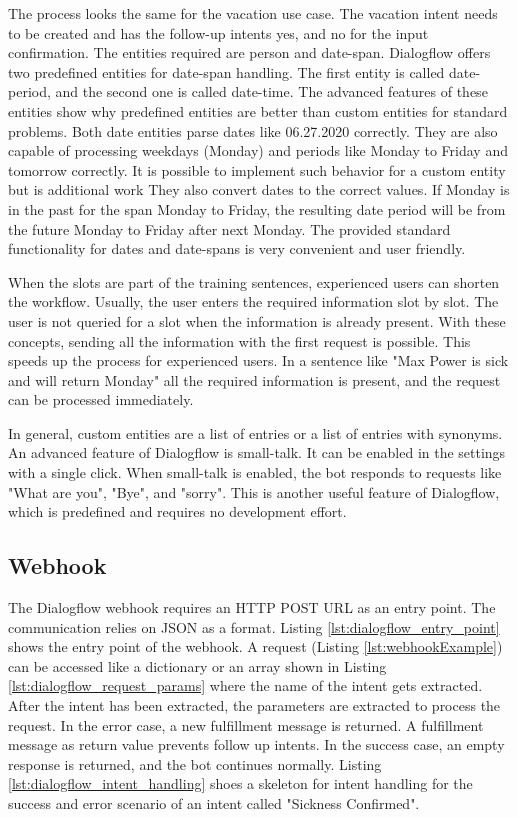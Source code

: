 The process looks the same for the vacation use case.
The vacation intent needs to be created and has the follow-up intents 
yes, and no for the input confirmation.
The entities required are person and date-span.
Dialogflow offers two predefined entities for date-span handling.
The first entity is called date-period, and the second one is called date-time.
The advanced features of these entities show why predefined entities are better than custom entities for standard problems.
Both date entities parse dates like 06.27.2020 correctly.
They are also capable of processing weekdays (Monday) and periods like Monday to Friday and tomorrow correctly.
It is possible to implement such behavior for a custom entity but is additional work
They also convert dates to the correct values.
If Monday is in the past for the span Monday to Friday, the resulting date period will be from the future Monday to Friday after next Monday.
The provided standard functionality for dates and date-spans is very convenient and user friendly.

When the slots are part of the training sentences, experienced users can shorten the workflow.
Usually, the user enters the required information slot by slot.
The user is not queried for a slot when the information is already present.
With these concepts, sending all the information with the first request is possible.
This speeds up the process for experienced users.
In a sentence like "Max Power is sick and will return Monday" all the required information is present, and the request can be processed immediately.
 

In general, custom entities are a list of entries or a list of entries with synonyms.
An advanced feature of Dialogflow is small-talk.
It can be enabled in the settings with a single click.
When small-talk is enabled, the bot responds to requests like "What are you", "Bye", and "sorry".
This is another useful feature of Dialogflow, which is predefined and requires no development effort. 

\subsection{Webhook}
The Dialogflow webhook requires an HTTP POST URL as an entry point.
The communication relies on JSON as a format.
Listing \ref{lst:dialogflow_entry_point} shows the entry point of the webhook.
A request (Listing \ref{lst:webhookExample}) can be accessed like a dictionary or an array shown in Listing \ref{lst:dialogflow_request_params} where the name of the intent gets extracted. 
After the intent has been extracted, the parameters are extracted to process the request.
In the error case, a new fulfillment message is returned.
A fulfillment message as return value prevents follow up intents.
In the success case, an empty response is returned, and the bot continues normally.
Listing \ref{lst:dialogflow_intent_handling} shoes a skeleton for intent handling for the success and error scenario of an intent called "Sickness Confirmed".

